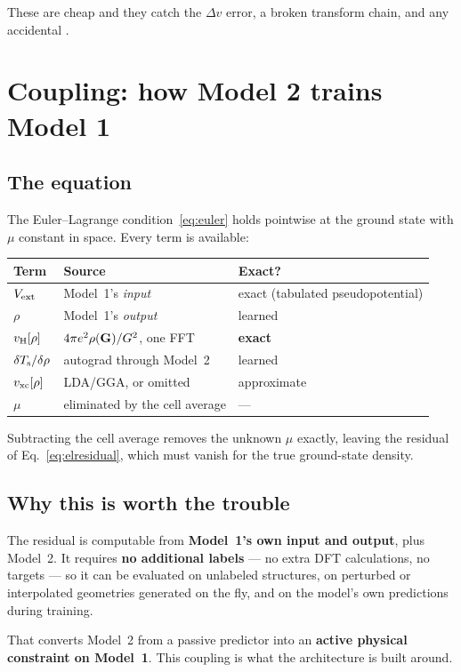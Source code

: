 These are cheap and they catch the $\Delta v$ error, a broken transform chain,
and any accidental .

\section{Coupling: how Model 2 trains Model 1}

\subsection{The equation}

The Euler--Lagrange condition~\eqref{eq:euler} holds pointwise at the ground
state with $\mu$ constant in space. Every term is available:

\begin{center}
\begin{tabular}{@{}lll@{}}
\toprule
Term & Source & Exact? \\
\midrule
$V_{\mathrm{ext}}$ & Model~1's \emph{input} & exact (tabulated pseudopotential) \\
$\rho$ & Model~1's \emph{output} & learned \\
$v_{\mathrm{H}}[\rho]$ & $4\pi e^2\rho(\mathbf{G})/G^2$, one FFT & \textbf{exact} \\
$\delta T_{\mathrm{s}}/\delta\rho$ & autograd through Model~2 & learned \\
$v_{\mathrm{xc}}[\rho]$ & LDA/GGA, or omitted & approximate \\
$\mu$ & eliminated by the cell average & --- \\
\bottomrule
\end{tabular}
\end{center}

Subtracting the cell average removes the unknown $\mu$ exactly, leaving the
residual of Eq.~\eqref{eq:elresidual}, which must vanish for the true
ground-state density.

\subsection{Why this is worth the trouble}

The residual is computable from \textbf{Model~1's own input and output}, plus
Model~2. It requires \textbf{no additional labels} --- no extra DFT
calculations, no targets --- so it can be evaluated on unlabeled structures,
on perturbed or interpolated geometries generated on the fly, and on the
model's own predictions during training.

That converts Model~2 from a passive predictor into an \textbf{active physical
constraint on Model~1}. This coupling is what the architecture is built around.

